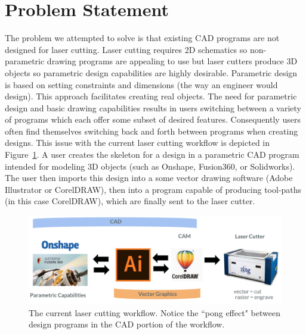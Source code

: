 \section{Problem Statement}

The problem we attempted to solve is that existing CAD programs are not designed for laser cutting. Laser cutting requires 2D schematics so non-parametric drawing programs are appealing to use but laser cutters produce 3D objects so parametric design capabilities are highly desirable. Parametric design is based on setting constraints and dimensions (the way an engineer would design). This approach facilitates creating real objects. The need for parametric design and basic drawing capabilities results in users switching between a variety of programs which each offer some subset of desired features. Consequently users often find themselves switching back and forth between programs when creating designs. This issue with the current laser cutting workflow is depicted in Figure~\ref{fig:laserCuttingWorkflow}. A user creates the skeleton for a design in a parametric CAD program intended for modeling 3D objects (such as Onshape, Fusion360, or Solidworks). The user then imports this design into a some vector drawing software (Adobe Illustrator or CorelDRAW), then into a program capable of producing tool-paths (in this case CorelDRAW), which are finally sent to the laser cutter.

\begin{figure}[!h]
  \includegraphics[width=\linewidth]{laserCuttingWorkflow.jpg}
  \caption{The current laser cutting workflow. Notice the ``pong effect" between design programs in the CAD portion of the workflow.}
  \label{fig:laserCuttingWorkflow}
\end{figure}


